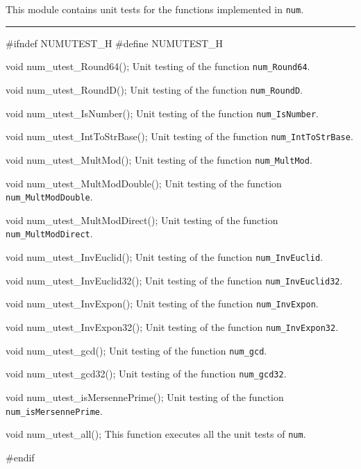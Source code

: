 
This module contains unit tests for the functions implemented in {\tt num}. 

\bigskip
\hrule
\code
\hide
#ifndef NUMUTEST_H
#define NUMUTEST_H
\endhide
\endcode

\code
void num_utest_Round64();
\endcode
 \tab  Unit testing of the function {\tt num\_Round64}.
 \endtab
\code

void num_utest_RoundD();
\endcode
 \tab  Unit testing of the function {\tt num\_RoundD}.
 \endtab
\code

void num_utest_IsNumber();
\endcode
 \tab  Unit testing of the function {\tt num\_IsNumber}.
 \endtab
\code

void num_utest_IntToStrBase();
\endcode
 \tab  Unit testing of the function {\tt num\_IntToStrBase}.
 \endtab
\code

void num_utest_MultMod();
\endcode
 \tab  Unit testing of the function {\tt num\_MultMod}.
 \endtab
\code

void num_utest_MultModDouble();
\endcode
 \tab  Unit testing of the function {\tt num\_MultModDouble}.
 \endtab
\code

void num_utest_MultModDirect();
\endcode
 \tab  Unit testing of the function {\tt num\_MultModDirect}.
 \endtab
\code

void num_utest_InvEuclid();
\endcode
 \tab  Unit testing of the function {\tt num\_InvEuclid}.
 \endtab
\code

void num_utest_InvEuclid32();
\endcode
 \tab  Unit testing of the function {\tt num\_InvEuclid32}.
 \endtab
\code

void num_utest_InvExpon();
\endcode
 \tab  Unit testing of the function {\tt num\_InvExpon}.
 \endtab
\code

void num_utest_InvExpon32();
\endcode
 \tab  Unit testing of the function {\tt num\_InvExpon32}.
 \endtab
\code

void num_utest_gcd();
\endcode
 \tab  Unit testing of the function {\tt num\_gcd}.
 \endtab
\code

void num_utest_gcd32();
\endcode
 \tab  Unit testing of the function {\tt num\_gcd32}.
 \endtab
\code

void num_utest_isMersennePrime();
\endcode
 \tab  Unit testing of the function {\tt num\_isMersennePrime}.
 \endtab
\code

void num_utest_all();
\endcode
 \tab  This function executes all the unit tests of {\tt num}.
 \endtab
\code


\hide
#endif
\endhide
\endcode

